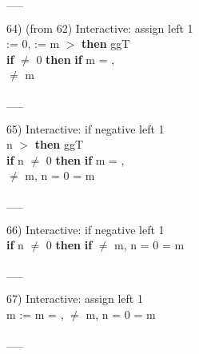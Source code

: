 \documentclass[a4paper]{article}
\begin{document}
\vspace{-1.5ex}\_\hrulefill \_

64)  (from 62) Interactive: assign left  1\\
\Do {} := 0,  := m\Dc
{}  $>$  {\bf then} ggT \\
 \tabf \tabudo{}\tabudc{} {\bf if}  $\neq$ 0 {\bf then} {\bf if}  %
m = , \\
 \tabf {} $\neq$ m \Fol

\vspace{-1.5ex}\_\hrulefill \_

65) Interactive: if negative left  1\\
 n $>$  {\bf then} ggT \\
 \tabf {} {\bf if} n $\neq$ 0 {\bf then} {\bf if}  %
m = , \\
 \tabf {} $\neq$ m, n = 0 \And {} = m \Fol

\vspace{-1.5ex}\_\hrulefill \_

66) Interactive: if negative left  1\\
\Do 
{\bf if} n $\neq$ 0 {\bf then} 
{\bf if}  %
 \tabf {} $\neq$ m, n = 0 \And {} = m \Fol

\vspace{-1.5ex}\_\hrulefill \_

67) Interactive: assign left  1\\
\Do m := \Dc m = ,  $\neq$ m, n = 0 \And {} = m \Fol 

\vspace{-1.5ex}\_\hrulefill \_
\end{document}
